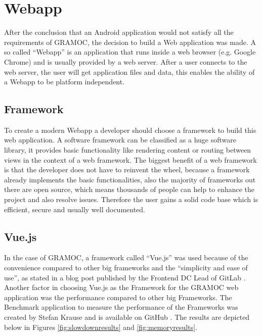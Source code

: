\chapter{Webapp}
\label{ch:Webapp}

\author{Nico Leidenfrost}
%
After the conclusion that an Android application would not satisfy all the requirements of GRAMOC, the decision to build a Web application was made. A so called ``Webapp'' is an application that runs inside a web browser (e.g. Google Chrome) and is usually provided by a web server. After a user connects to the web server, the user will get application files and data, this enables the ability of a Webapp to be platform independent.

\section{Framework}
To create a modern Webapp a developer should choose a framework to build this web application. A software framework can be classified as a huge software library, it provides basic functionality like rendering content or routing between views in the context of a web framework. The biggest benefit of a web framework is that the developer does not have to reinvent the wheel, because a framework already implements the basic functionalities, also the majority of frameworks out there are open source, which means thousands of people can help to enhance the project and also resolve issues. Therefore the user gains a solid code base which is efficient, secure and usually well documented.

\section{Vue.js}
In the case of GRAMOC, a framework called ``Vue.js'' was used because of the convenience compared to other big frameworks and the ``simplicity and ease of use'', as stated in a blog post published by the Frontend DC Lead of GitLab \cite{Vue, WhyVue, GitLab}. Another factor in choosing Vue.js as the Framework for the GRAMOC web application was the performance compared to other big Frameworks. The Benchmark application to measure the performance of the Frameworks was created by Stefan Krause and is available on GitHub \cite{FrameworkBenchmark}. The results are depicted below in Figures \ref{fig:slowdownresults} and \ref{fig:memoryresults}.

\frameworkdata

